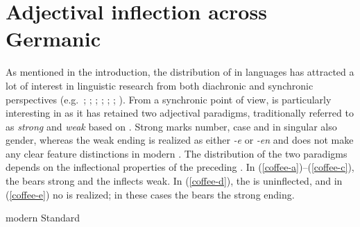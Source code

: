 \documentclass[output=paper,colorlinks,citecolor=brown]{langscibook}
\begin{document}
\section{Adjectival inflection across Germanic}\label{sect:bg-infl}

As mentioned in the introduction, the distribution of  in  languages has attracted a lot of interest in linguistic research from both diachronic and synchronic perspectives (e.g.~\citealp{Demske01}; \citealp{Gallmann1996}; \citealp{HaberlandHeltoft2008}; \citealp{leu2015architecture}; \citealp{olsen1991deutsche}; \citealp{Pfaff2017, Pfaff2020}; \citealp{roehrs2006morpho, roehrs2015inflections}). From a synchronic point of view,  is particularly interesting in  as it has retained two adjectival paradigms, traditionally referred to as \textit{strong} and \textit{weak} based on \citet[597]{Grimm1822}. Strong  marks number, case and in singular also gender, whereas the weak ending is realized as either \textit{-e} or \textit{-en} and does not make any clear feature distinctions in modern . The distribution of the two paradigms depends on the inflectional properties of the preceding . In (\ref{coffee-a})--(\ref{coffee-c}), the  bears strong  and the  inflects weak. In (\ref{coffee-d}), the  is uninflected, and in (\ref{coffee-e}) no  is realized; in these cases the  bears the strong ending.

\ea modern Standard 
\z 
\z 
\end{document}

